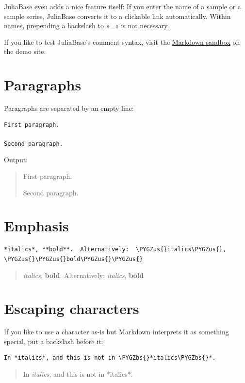 \documentclass[a4paper,11pt,english]{sphinxmanual}
\def\PYGZbs{\char`\\}
\def\PYGZus{\char`\_}
\begin{document}
JuliaBase even adds a nice feature itself: If you enter the name of a sample or a
sample series, JuliaBase converts it to a clickable link automatically.  Within
names, prepending a backslash to »\_« is not necessary.

If you like to test JuliaBase's comment syntax, visit the \href{https://demo.juliabase.org/markdown}{Markdown sandbox} on the demo site.


\section{Paragraphs}
\label{markdown:paragraphs}
Paragraphs are separated by an empty line:

\begin{Verbatim}[commandchars=\\\{\},formatcom=\scriptsize]
First paragraph.

Second paragraph.
\end{Verbatim}

Output:
\begin{quote}

First paragraph.

Second paragraph.
\end{quote}


\section{Emphasis}
\label{markdown:emphasis}
\begin{Verbatim}[commandchars=\\\{\},formatcom=\scriptsize]
*italics*, **bold**.  Alternatively:  \PYGZus{}italics\PYGZus{}, \PYGZus{}\PYGZus{}bold\PYGZus{}\PYGZus{}
\end{Verbatim}
\begin{quote}

\emph{italics}, \textbf{bold}.  Alternatively: \emph{italics}, \textbf{bold}
\end{quote}


\section{Escaping characters}
\label{markdown:escaping-characters}
If you like to use a character as-is but Markdown interprets it as something
special, put a backslash before it:

\begin{Verbatim}[commandchars=\\\{\},formatcom=\scriptsize]
In *italics*, and this is not in \PYGZbs{}*italics\PYGZbs{}*.
\end{Verbatim}
\begin{quote}

In \emph{italics}, and this is not in *italics*.
\end{quote}
\end{document}
